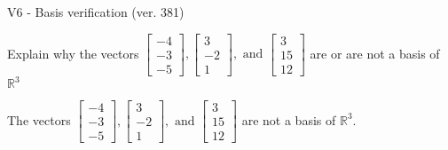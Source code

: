 \begin{exercise}
  \begin{exerciseTitle}V6 - Basis verification (ver. 381)\end{exerciseTitle}
  \begin{exerciseStatement}
    Explain why the vectors \(\left[\begin{array}{r}
-4 \\
-3 \\
-5
\end{array}\right] , \left[\begin{array}{r}
3 \\
-2 \\
1
\end{array}\right] , \text{ and } \left[\begin{array}{r}
3 \\
15 \\
12
\end{array}\right]\) are or are not a basis of \(\mathbb{R}^3\)	


  \end{exerciseStatement}
  \begin{exerciseAnswer}
   The vectors \(\left[\begin{array}{r}
-4 \\
-3 \\
-5
\end{array}\right] , \left[\begin{array}{r}
3 \\
-2 \\
1
\end{array}\right] , \text{ and } \left[\begin{array}{r}
3 \\
15 \\
12
\end{array}\right]\) 
  	 are not  a basis of \(\mathbb{R}^3\).
  


  \end{exerciseAnswer}
\end{exercise}